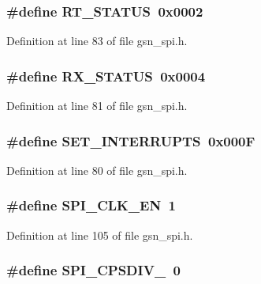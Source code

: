 \hypertarget{a00587_a202d8710d0c6930b5c266948f5712d7a}{
\subsubsection[{RT\_\-STATUS}]{\setlength{\rightskip}{0pt plus 5cm}\#define RT\_\-STATUS~0x0002}}
\label{a00587_a202d8710d0c6930b5c266948f5712d7a}


Definition at line 83 of file gsn\_\-spi.h.

\hypertarget{a00587_a731d30ee0b5f9f0471fa8e742ef1784c}{
\subsubsection[{RX\_\-STATUS}]{\setlength{\rightskip}{0pt plus 5cm}\#define RX\_\-STATUS~0x0004}}
\label{a00587_a731d30ee0b5f9f0471fa8e742ef1784c}


Definition at line 81 of file gsn\_\-spi.h.

\hypertarget{a00587_a0710240ccdbef200879fbec6fde50342}{
\subsubsection[{SET\_\-INTERRUPTS}]{\setlength{\rightskip}{0pt plus 5cm}\#define SET\_\-INTERRUPTS~0x000F}}
\label{a00587_a0710240ccdbef200879fbec6fde50342}


Definition at line 80 of file gsn\_\-spi.h.

\hypertarget{a00587_aeaf92c7c4fbd8a6ccda7d2100f26893f}{
\subsubsection[{SPI\_\-CLK\_\-EN}]{\setlength{\rightskip}{0pt plus 5cm}\#define SPI\_\-CLK\_\-EN~1}}
\label{a00587_aeaf92c7c4fbd8a6ccda7d2100f26893f}


Definition at line 105 of file gsn\_\-spi.h.

\hypertarget{a00587_a8d0e49a864453c0acecdd4078256442b}{
\subsubsection[{SPI\_\-CPSDIV\_\-0}]{\setlength{\rightskip}{0pt plus 5cm}\#define SPI\_\-CPSDIV\_~0}}
\label{a00587_a8d0e49a864453c0acecdd4078256442b}


